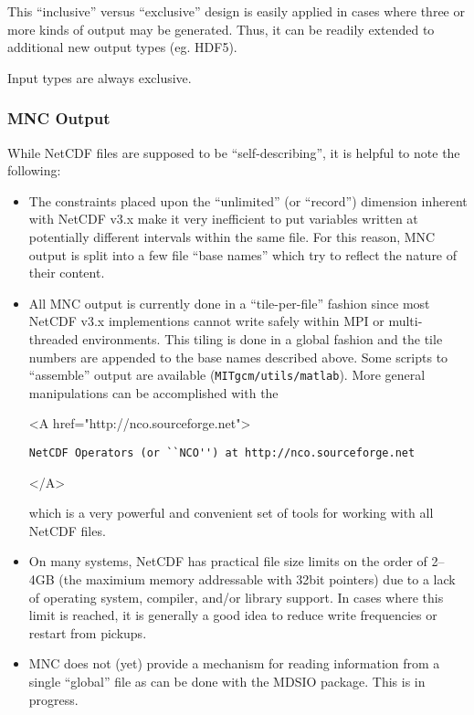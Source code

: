This ``inclusive'' versus ``exclusive'' design is easily applied in
cases where three or more kinds of output may be generated.  Thus, it
can be readily extended to additional new output types (eg. HDF5).

Input types are always exclusive.

\subsubsection{MNC Output}

While NetCDF files are supposed to be ``self-describing'', it is
helpful to note the following:

\begin{itemize}
\item The constraints placed upon the ``unlimited'' (or ``record'')
  dimension inherent with NetCDF v3.x make it very inefficient to put
  variables written at potentially different intervals within the same
  file.  For this reason, MNC output is split into a few file ``base
  names'' which try to reflect the nature of their content.
  
\item All MNC output is currently done in a ``tile-per-file'' fashion
  since most NetCDF v3.x implementions cannot write safely within MPI
  or multi-threaded environments.  This tiling is done in a global
  fashion and the tile numbers are appended to the base names
  described above.  Some scripts to ``assemble'' output are available
  (\texttt{MITgcm/utils/matlab}).  More general manipulations can be
  accomplished with the
  \begin{rawhtml}
    <A href="http://nco.sourceforge.net"> 
  \end{rawhtml} 
\begin{verbatim}
NetCDF Operators (or ``NCO'') at http://nco.sourceforge.net
\end{verbatim}
  \begin{rawhtml} </A> \end{rawhtml}
  which is a very powerful and convenient set of tools for working
  with all NetCDF files.
  
\item On many systems, NetCDF has practical file size limits on the
  order of 2--4GB (the maximium memory addressable with 32bit
  pointers) due to a lack of operating system, compiler, and/or
  library support.  In cases where this limit is reached, it is
  generally a good idea to reduce write frequencies or restart from
  pickups.
  
\item MNC does not (yet) provide a mechanism for reading information
  from a single ``global'' file as can be done with the MDSIO
  package.  This is in progress.

\end{itemize}


